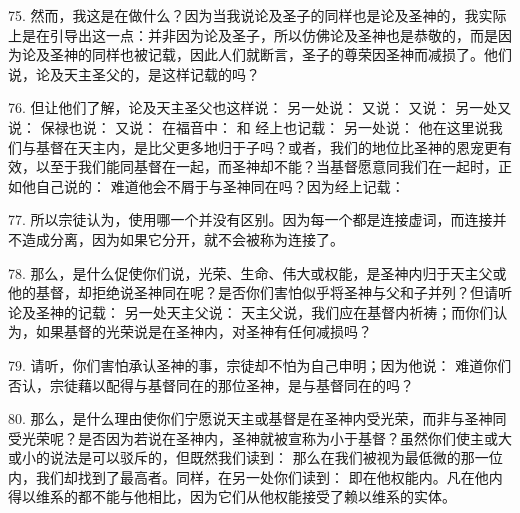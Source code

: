75. 然而，我这是在做什么？因为当我说论及圣子的同样也是论及圣神的，我实际上是在引导出这一点：并非因为论及圣子，所以仿佛论及圣神也是恭敬的，而是因为论及圣神的同样也被记载，因此人们就断言，圣子的尊荣因圣神而减损了。他们说，论及天主圣父的，是这样记载的吗？\par

76. 但让他们了解，论及天主圣父也这样说： 另一处说： 又说： 又说： 另一处又说：  保禄也说：  又说：  在福音中： 和   经上也记载：  另一处说：  他在这里说我们与基督在天主内，是比父更多地归于子吗？或者，我们的地位比圣神的恩宠更有效，以至于我们能同基督在一起，而圣神却不能？当基督愿意同我们在一起时，正如他自己说的：  难道他会不屑于与圣神同在吗？因为经上记载： \par

77. 所以宗徒认为，使用哪一个并没有区别。因为每一个都是连接虚词，而连接并不造成分离，因为如果它分开，就不会被称为连接了。\par

78. 那么，是什么促使你们说，光荣、生命、伟大或权能，是圣神内归于天主父或他的基督，却拒绝说圣神同在呢？是否你们害怕似乎将圣神与父和子并列？但请听论及圣神的记载：  另一处天主父说： 天主父说，我们应在基督内祈祷；而你们认为，如果基督的光荣说是在圣神内，对圣神有任何减损吗？\par

79. 请听，你们害怕承认圣神的事，宗徒却不怕为自己申明；因为他说：  难道你们否认，宗徒藉以配得与基督同在的那位圣神，是与基督同在的吗？\par

80. 那么，是什么理由使你们宁愿说天主或基督是在圣神内受光荣，而非与圣神同受光荣呢？是否因为若说在圣神内，圣神就被宣称为小于基督？虽然你们使主或大或小的说法是可以驳斥的，但既然我们读到：  那么在我们被视为最低微的那一位内，我们却找到了最高者。同样，在另一处你们读到：  即在他权能内。凡在他内得以维系的都不能与他相比，因为它们从他权能接受了赖以维系的实体。\par

